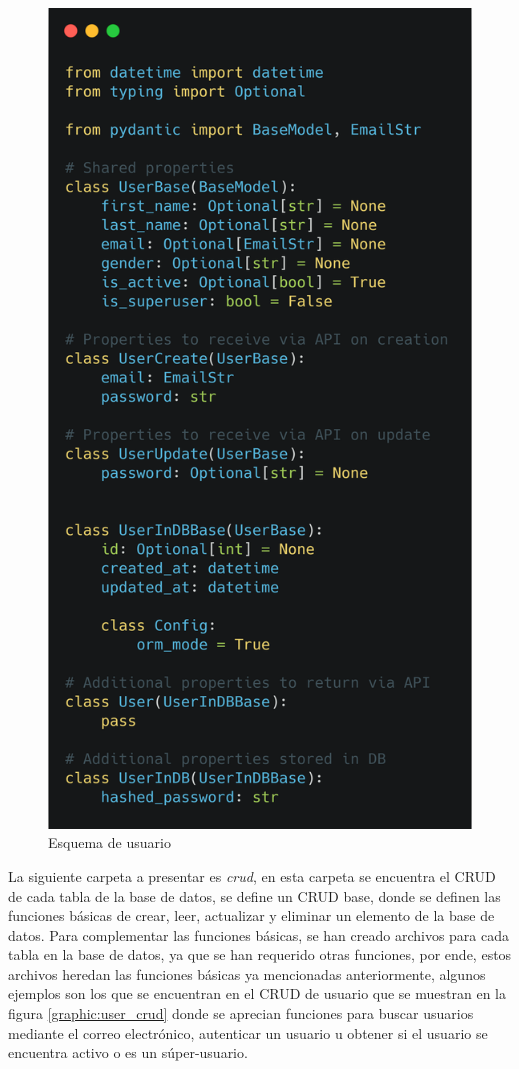 \begin{figure}[!htb]
    \centering
    \includegraphics[scale=.15]{TT/img/implementacion/schema-user.png}
    \caption{Esquema de usuario}
    \label{graphic:user_schema}    
\end{figure}

La siguiente carpeta a presentar es \textit{crud}, en esta carpeta se encuentra el CRUD de cada tabla de la base de datos, se define un CRUD base, donde se definen las funciones básicas de crear, leer, actualizar y eliminar un elemento de la base de datos. Para complementar las funciones básicas, se han creado archivos para cada tabla en la base de datos, ya que se han requerido otras funciones, por ende, estos archivos heredan las funciones básicas ya mencionadas anteriormente, algunos ejemplos son los que se encuentran en el CRUD de usuario que se muestran en la figura \ref{graphic:user_crud} donde se aprecian funciones para buscar usuarios mediante el correo electrónico, autenticar un usuario u obtener si el usuario se encuentra activo o es un súper-usuario.

